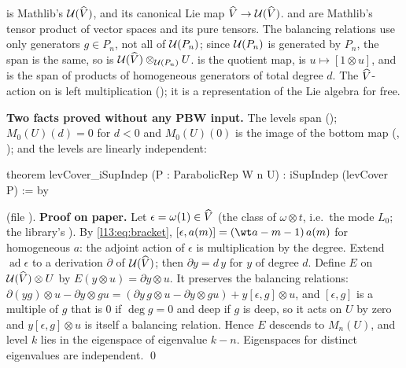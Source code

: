 \begin{dictionary}
 is Mathlib's $\mathcal{U}(\widehat{V})$, and  its
canonical Lie map $\widehat{V}\to\mathcal{U}(\widehat{V})$.  and  are Mathlib's tensor product of
vector spaces and its pure tensors. The balancing relations use only generators $g\in P_n$, not all of
$\mathcal{U}(P_n)$; since $\mathcal{U}(P_n)$ is generated by $P_n$, the span is the same, so  is
$\mathcal{U}(\widehat{V})\otimes_{\mathcal{U}(P_n)}U$.  is the quotient map,  is
$u\mapsto[1\otimes u]$, and  is the span of products of homogeneous generators of total degree $d$.
The $\widehat{V}$-action on  is left multiplication (); it is a representation of the Lie algebra
for free.

\textbf{Two facts proved without any PBW input.} The levels span (); $M_0(U)(d) = 0$ for $d<0$
and $M_0(U)(0)$ is the image of the bottom map (, ); and the
levels are linearly independent:
\end{dictionary}

\begin{leancode}
theorem levCover_iSupIndep (P : ParabolicRep W n U) : iSupIndep (levCover P) := by
\end{leancode}
\noindent (file ).
\textbf{Proof on paper.} Let $\epsilon = \omega(1)\in\widehat{V}$ (the class of $\omega\otimes t$, i.e.\ the mode $L_0$; the
library's ). By \eqref{l13:eq:bracket}, $[\epsilon,a(m)] = (\wt a-m-1)\,a(m)$ for homogeneous $a$: the
adjoint action of $\epsilon$ is multiplication by the degree. Extend $\operatorname{ad}\epsilon$ to a derivation $\partial$ of
$\mathcal{U}(\widehat{V})$; then $\partial y = d\,y$ for $y$ of degree $d$. Define $E$ on $\mathcal{U}(\widehat{V})\otimes U$ by
$E(y\otimes u) = \partial y\otimes u$. It preserves the balancing relations: $\partial(yg)\otimes u - \partial y\otimes gu =
(\partial y\,g\otimes u - \partial y\otimes gu) + y[\epsilon,g]\otimes u$, and $[\epsilon,g]$ is a multiple of $g$ that is $0$ if
$\deg g = 0$ and deep if $g$ is deep, so it acts on $U$ by zero and $y[\epsilon,g]\otimes u$ is itself a balancing relation. Hence
$E$ descends to $M_n(U)$, and level $k$ lies in the eigenspace of eigenvalue $k-n$. Eigenspaces for distinct eigenvalues are
independent. \qed

